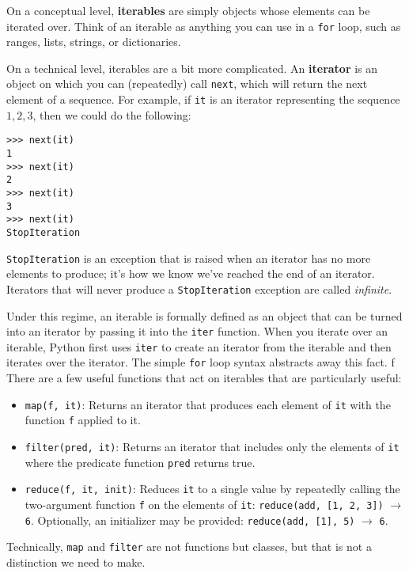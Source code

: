 On a conceptual level, \textbf{iterables} are simply objects whose elements can be iterated over. Think of an iterable as anything you can use in a \lstinline{for} loop, such as ranges, lists, strings, or dictionaries.

On a technical level, iterables are a bit more complicated. An \textbf{iterator} is an object on which you can (repeatedly) call \lstinline{next}, which will return the next element of a sequence. For example, if \lstinline{it} is an iterator representing the sequence $1, 2, 3$, then we could do the following: 
\begin{lstlisting}
>>> next(it)
1
>>> next(it)
2
>>> next(it)
3
>>> next(it)
StopIteration
\end{lstlisting}

\lstinline{StopIteration} is an exception that is raised when an iterator has no more elements to produce; it's how we know we've reached the end of an iterator. Iterators that will never produce a \lstinline{StopIteration} exception are called \textit{infinite}. 

Under this regime, an iterable is formally defined as an object that can be turned into an iterator by passing it into the \lstinline{iter} function. When you iterate over an iterable, Python first uses \lstinline{iter} to create an iterator from the iterable and then iterates over the iterator. The simple \lstinline{for} loop syntax abstracts away this fact. 
f
There are a few useful functions that act on iterables that are particularly useful: 
\begin{itemize}
    \item \lstinline{map(f, it)}: Returns an iterator that produces each element of \lstinline{it} with the function \lstinline{f} applied to it.
    \item \lstinline{filter(pred, it)}: Returns an iterator that includes only the elements of \lstinline{it} where the predicate function \lstinline{pred} returns true. 
    \item \lstinline{reduce(f, it, init)}: Reduces \lstinline{it} to a single value by repeatedly calling the two-argument function \lstinline{f} on the elements of \lstinline{it}: \lstinline{reduce(add, [1, 2, 3])} $\rightarrow$ \lstinline{6}. Optionally, an initializer may be provided: \lstinline{reduce(add, [1], 5)} $\rightarrow$ \lstinline{6}. 
\end{itemize}

\begin{meta}
Technically, \lstinline{map} and \lstinline{filter} are not functions but classes, but that is not a distinction we need to make. 
\end{meta}

